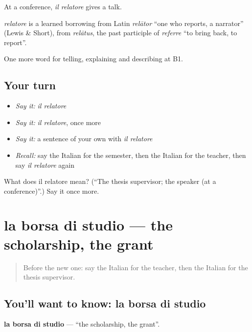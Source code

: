 At a conference, \emph{il relatore} gives a talk.

\begin{cousinweb}
\emph{relatore} is a learned borrowing from Latin \emph{relātor} \textquotedblleft{}one who reports, a narrator\textquotedblright{} (Lewis \& Short), from \emph{relātus}, the past participle of \emph{referre} \textquotedblleft{}to bring back, to report\textquotedblright{}.
\end{cousinweb}

\begin{grammarlens}[title={What you've built}]
One more word for telling, explaining and describing at B1.
\end{grammarlens}

\subsection*{Your turn}
\begin{itemize}
\raggedright
  \item \emph{Say it:} \emph{il relatore}
  \item \emph{Say it:} \emph{il relatore}, once more
  \item \emph{Say it:} a sentence of your own with \emph{il relatore}
  \item \emph{Recall:} say the Italian for the semester, then the Italian for the teacher, then say \emph{il relatore} again
\end{itemize}

\begin{tcolorbox}[breakable,colback=teal!4,colframe=teal!35!black,title={Before you move on}]
What does il relatore mean? (\textquotedblleft{}The thesis supervisor; the speaker (at a conference)\textquotedblright{}.) Say it once more.
\end{tcolorbox}
\section[la borsa di studio]{la borsa di studio — the scholarship, the grant}

\label{lesson:IT-C381-borsa-di-studio}



\begin{quote}
Before the new one: say the Italian for the teacher, then the Italian for the thesis supervisor.
\end{quote}

\subsection*{You'll want to know: la borsa di studio}
\textbf{la borsa di studio} — \textquotedblleft{}the scholarship, the grant\textquotedblright{}.

